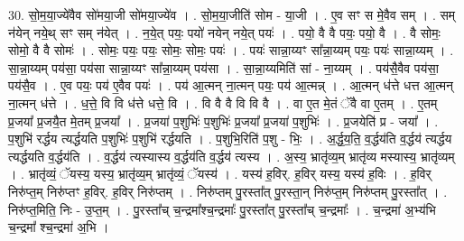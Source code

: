\documentclass[17pt]{extarticle}
\begin{document}
30. सो॒म॒या॒ज्ये॑वैव सो॑मया॒जी सो॑मया॒ज्ये॑व । . सो॒म॒या॒जीति॑ सोम - या॒जी । . ए॒व सꣳ स मे॒वैव सम् । . सम् न॑येन् नये॒थ् सꣳ सम् न॑येत् । . न॒ये॒त् पयः॒ पयो॑ नयेन् नये॒त् पयः॑ । . पयो॒ वै वै पयः॒ पयो॒ वै । . वै सोमः॒ सोमो॒ वै वै सोमः॑ । . सोमः॒ पयः॒ पयः॒ सोमः॒ सोमः॒ पयः॑ । . पयः॑ सान्ना॒य्यꣳ सा᳚न्ना॒य्यम् पयः॒ पयः॑ सान्ना॒य्यम् । . सा॒न्ना॒य्यम् पय॑सा॒ पय॑सा सान्ना॒य्यꣳ सा᳚न्ना॒य्यम् पय॑सा । . सा॒न्ना॒य्यमिति॑ सां - ना॒य्यम् । . पय॑सै॒वैव पय॑सा॒ पय॑सै॒व । . ए॒व पयः॒ पय॑ ए॒वैव पयः॑ । . पय॑ आ॒त्मन् ना॒त्मन् पयः॒ पय॑ आ॒त्मन्न् । . आ॒त्मन् ध॑त्ते धत्त आ॒त्मन् ना॒त्मन् ध॑त्ते । . ध॒त्ते॒ वि वि ध॑त्ते धत्ते॒ वि । . वि वै वै वि वि वै । . वा ए॒त मे॒तं ॅवै वा ए॒तम् । . ए॒तम् प्र॒जया᳚ प्र॒जयै॒त मे॒तम् प्र॒जया᳚ । . प्र॒जया॑ प॒शुभिः॑ प॒शुभिः॑ प्र॒जया᳚ प्र॒जया॑ प॒शुभिः॑ । . प्र॒जयेति॑ प्र - जया᳚ । . प॒शुभि॑ रर्द्धय त्यर्द्धयति प॒शुभिः॑ प॒शुभि॑ रर्द्धयति । . प॒शुभि॒रिति॑ प॒शु - भिः॒ । . अ॒र्द्ध॒य॒ति॒ व॒र्द्धय॑ति व॒र्द्धय॑ त्यर्द्धय त्यर्द्धयति व॒र्द्धय॑ति । . व॒र्द्धय॑ त्यस्यास्य व॒र्द्धय॑ति व॒र्द्धय॑ त्यस्य । . अ॒स्य॒ भ्रातृ॑व्य॒म् भ्रातृ॑व्य मस्यास्य॒ भ्रातृ॑व्यम् । . भ्रातृ॑व्यं॒ ॅयस्य॒ यस्य॒ भ्रातृ॑व्य॒म् भ्रातृ॑व्यं॒ ॅयस्य॑ । . यस्य॑ ह॒विर्. ह॒विर् यस्य॒ यस्य॑ ह॒विः । . ह॒विर् निरु॑प्त॒म् निरु॑प्तꣳ ह॒विर्. ह॒विर् निरु॑प्तम् । . निरु॑प्तम् पु॒रस्ता᳚त् पु॒रस्ता॒न् निरु॑प्त॒म् निरु॑प्तम् पु॒रस्ता᳚त् । . निरु॑प्त॒मिति॒ निः - उ॒प्त॒म् । . पु॒रस्ता᳚च् च॒न्द्रमा᳚श्च॒न्द्रमाः᳚ पु॒रस्ता᳚त् पु॒रस्ता᳚च् च॒न्द्रमाः᳚ । . च॒न्द्रमा॑ अ॒भ्य॑भि च॒न्द्रमा᳚ श्च॒न्द्रमा॑ अ॒भि । \newline
\end{document}
